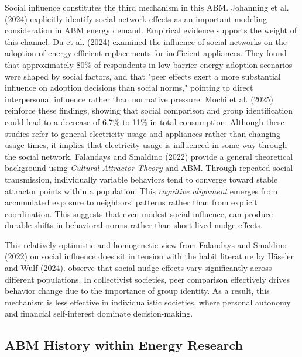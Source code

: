 \documentclass[11pt, a4paper]{article}
\begin{document}
Social influence constitutes the third mechanism in this ABM. Johanning et al. (2024) explicitly identify social network effects as an important modeling consideration in ABM energy demand. Empirical evidence supports the weight of this channel. Du et al. (2024) examined the influence of social networks on the adoption of energy-efficient replacements for inefficient appliances. They found that approximately 80\% of respondents in low-barrier energy adoption scenarios were shaped by social factors, and that "peer effects exert a more substantial influence on adoption decisions than social norms," pointing to direct interpersonal influence rather than normative pressure. Mochi et al. (2025) reinforce these findings, showing that social comparison and group identification could lead to a decrease of 6.7\% to 11\% in total consumption. Although these studies refer to general electricity usage and appliances rather than changing usage times, it implies that electricity usage is influenced in some way through the social network.  Falandays and Smaldino (2022) provide a general theoretical background using \textit{Cultural Attractor Theory} and ABM. Through repeated social transmission, individually variable behaviors tend to converge toward stable attractor points within a population. This \textit{cognitive alignment} emerges from accumulated exposure to neighbors' patterns rather than from explicit coordination. This suggests that even modest social influence, can produce durable shifts in behavioral norms rather than short-lived nudge effects.

This relatively optimistic and homogenetic view from Falandays and Smaldino (2022) on social influence does sit in tension with the habit literature by Häseler and Wulf (2024). \cite{mochi_social_2025} observe that social nudge effects vary significantly across different populations. In collectivist societies, peer comparison effectively drives behavior change due to the importance of group identity. As a result, this mechanism is less effective in individualistic societies, where personal autonomy and financial self-interest dominate decision-making. 

\subsection{ABM History within Energy Research} \label{subs:abmhistory}
\end{document}
